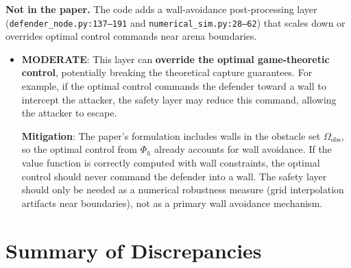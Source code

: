 \documentclass[11pt,a4paper]{article}
\begin{document}
\textbf{Not in the paper.} The code adds a wall-avoidance post-processing layer (\texttt{defender\_node.py:137--191} and \texttt{numerical\_sim.py:28--62}) that scales down or overrides optimal control commands near arena boundaries.

\begin{itemize}
\item \textcolor{modoran}{\textbf{MODERATE}}: This layer can \textbf{override the optimal game-theoretic control}, potentially breaking the theoretical capture guarantees. For example, if the optimal control commands the defender toward a wall to intercept the attacker, the safety layer may reduce this command, allowing the attacker to escape.

\textbf{Mitigation}: The paper's formulation includes walls in the obstacle set $\Omega_{\mathrm{obs}}$, so the optimal control from $\Phi_h$ already accounts for wall avoidance. If the value function is correctly computed with wall constraints, the optimal control should never command the defender into a wall. The safety layer should only be needed as a numerical robustness measure (grid interpolation artifacts near boundaries), not as a primary wall avoidance mechanism.
\end{itemize}

\section{Summary of Discrepancies}
\end{document}
